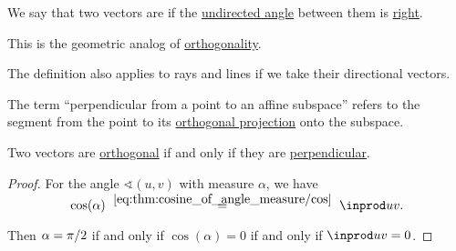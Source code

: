 \begin{definition}\label{def:perpendicularity}\mimprovised
  We say that two vectors are  if the \hyperref[def:angle/undirected]{undirected angle} between them is \hyperref[def:angle/measure/right]{right}.

  This is the geometric analog of \hyperref[def:orthogonality]{orthogonality}.

  The definition also applies to rays and lines if we take their directional vectors.

  The term \enquote{perpendicular from a point to an affine subspace} refers to the segment from the point to its \hyperref[def:orthogonal_projection]{orthogonal projection} onto the subspace.
\end{definition}

\begin{proposition}\label{thm:perpendicular_iff_orthogonal}
  Two vectors are \hyperref[def:orthogonality]{orthogonal} if and only if they are \hyperref[def:perpendicularity]{perpendicular}.
\end{proposition}
\begin{proof}
  For the angle \( \sphericalangle(u, v) \) with measure \( \alpha \), we have
  \begin{equation*}
    \cos(\alpha)
    \reloset {\eqref{eq:thm:cosine_of_angle_measure/cos}} =
    \inprod u v.
  \end{equation*}

  Then \( \alpha = \ifrac \pi 2 \) if and only if \( \cos(\alpha) = 0 \) if and only if \( \inprod u v = 0 \).
\end{proof}

